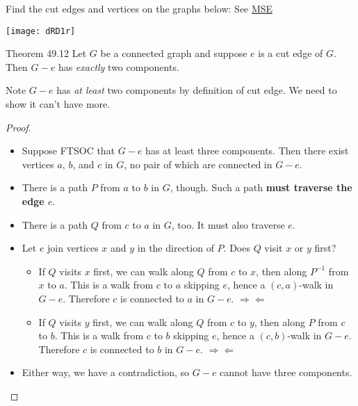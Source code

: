 \documentclass[ignorenonframetext,aspectratio=169]{beamer}
\newcommand{\raa}{$\Rightarrow\Leftarrow$}
\begin{document}
\begin{example}
Find the cut edges and vertices on the graphs below:
See \href{https://math.stackexchange.com/q/457159/2785}{MSE}
\begin{center}
\texttt{[image: dRD1r]}
\end{center}
\end{example}

\begin{frame}[label=cut-thm]
    \begin{block}{Theorem 49.12}
   Let $G$ be a connected graph and suppose $e$ is a cut edge of $G$.
   Then $G-e$ has \emph{exactly} two components.
   \end{block}
   Note $G-e$ has \emph{at least} two components by definition of cut edge.
   We need to show it can't have more.
\end{frame}

\begin{frame}[label=cut-proof]
\begin{proof}
\begin{overlayarea}{\textwidth}{0.8\textheight}
\begin{itemize}
\item<only@1-4|uncover@+-> Suppose FTSOC that $G-e$ has at least three components.  Then there exist vertices $a$, $b$, and $c$ in $G$,
no pair of which are connected in $G-e$.
\item<only@1-4|uncover@+-> There is a path $P$ from $a$ to $b$ in $G$, though.  Such a path \textbf{must traverse the edge $e$}.
\item<only@1-4|uncover@+-> There is a path $Q$ from $c$ to $a$ in $G$, too.  It must also traverse $e$.
\item<uncover@+-> Let $e$ join vertices $x$ and $y$ in the direction of $P$.  Does $Q$ visit $x$ or $y$ first?
\begin{itemize}
\item<uncover@+-> If $Q$ visits $x$ first, we can walk along $Q$ from $c$ to $x$, then along $P^{-1}$ from $x$ to $a$.
    This is a walk from $c$ to $a$ skipping $e$, hence a $(c,a)$-walk in $G-e$.  Therefore $c$ is connected to $a$ in $G-e$.
    \raa
\item<uncover@+-> If $Q$ visits $y$ first, we can walk along $Q$ from $c$ to $y$, then along $P$ from $c$ to $b$.
    This is a walk from $c$ to $b$ skipping $e$, hence a $(c,b)$-walk in $G-e$.  Therefore $c$ is connected to $b$ in $G-e$.
    \raa
\end{itemize}
\item<uncover@+-> Either way, we have a contradiction, so $G-e$ cannot have three components.\qedhere
\end{itemize}

\end{overlayarea}\end{proof}
\end{frame}
\end{document}
